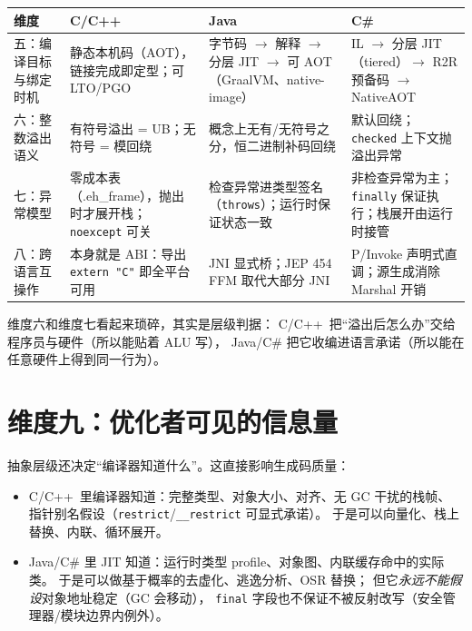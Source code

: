 \documentclass[12pt,a4paper,fontset=fandol]{ctexbook}
\newcommand{\Cplus}[1]{C++\,#1}
\begin{document}
\begin{longtable}{@{}>{\raggedright\arraybackslash}p{}>{\raggedright\arraybackslash}p{}>{\raggedright\arraybackslash}p{}>{\raggedright\arraybackslash}p{}@{}}
\toprule
\textbf{维度} & \textbf{C/\allowbreak{}\Cplus{}} & \textbf{Java} & \textbf{C\#} \\
\midrule
五：编译目标与绑定时机 &
  静态本机码（AOT），链接完成即定型；可 LTO/PGO &
  字节码 $\to$ 解释 $\to$ 分层 JIT $\to$ 可 AOT（GraalVM、native-image） &
  IL $\to$ 分层 JIT（tiered）$\to$ R2R 预备码 $\to$ NativeAOT \\
\addlinespace
六：整数溢出语义 &
  有符号溢出 = UB；无符号 = 模回绕 &
  概念上无有/无符号之分，恒二进制补码回绕 &
  默认回绕；\texttt{checked} 上下文抛溢出异常 \\
\addlinespace
七：异常模型 &
  零成本表（.eh\_frame），抛出时才展开栈；\texttt{noexcept} 可关 &
  检查异常进类型签名（\texttt{throws}）；运行时保证状态一致 &
  非检查异常为主；\texttt{finally} 保证执行；栈展开由运行时接管 \\
\addlinespace
八：跨语言互操作 &
  本身就是 ABI：导出 \texttt{extern "C"} 即全平台可用 &
  JNI 显式桥；JEP 454 FFM 取代大部分 JNI &
  P/Invoke 声明式直调；源生成消除 Marshal 开销 \\
\bottomrule
\end{longtable}

维度六和维度七看起来琐碎，其实是层级判据：
C/\allowbreak{}\Cplus{} 把``溢出后怎么办''交给程序员与硬件（所以能贴着 ALU 写），
Java/C\# 把它收编进语言承诺（所以能在任意硬件上得到同一行为）。

\section{维度九：优化者可见的信息量}

抽象层级还决定``编译器知道什么''。这直接影响生成码质量：

\begin{itemize}
  \item C/\allowbreak{}\Cplus{} 里编译器知道：完整类型、对象大小、对齐、无 GC 干扰的栈帧、
        指针别名假设（\texttt{restrict}/\allowbreak{}\texttt{\_\_restrict} 可显式承诺）。
        于是可以向量化、栈上替换、内联、循环展开。
  \item Java/C\# 里 JIT 知道：运行时类型 profile、对象图、内联缓存命中的实际类。
        于是可以做基于概率的去虚化、逃逸分析、OSR 替换；
        但它\emph{永远不能假设}对象地址稳定（GC 会移动），
        \texttt{final} 字段也不保证不被反射改写（安全管理器/模块边界内例外）。
\end{itemize}
\end{document}
